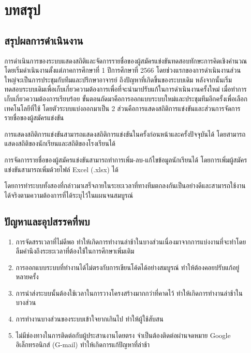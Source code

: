 \chapter{บทสรุป}
\label{chapter:conclusion}

\section{สรุปผลการดำเนินงาน}

การดำเนินการของระบบแสดงสถิติและจัดการรายชื่อของผู้สมัครแข่งขันทดสอบทักษะการคิดเชิงคำนวณ โดยเริ่มดำเนินงานตั้งแต่ภาคการศึกษาที่ 1 ปีการศึกษาที่ 2566 โดยช่วงแรกของการดำเนินงานส่วนใหญ่จะเป็นการประชุมกับทีมและปรึกษาอาจารย์ ถึงปัญหาที่เกิดขึ้นของระบบเดิม หลังจากนั้นเริ่มทดสอบระบบเดิมเพื่อเก็บเกี่ยวความต้องการเพื่อที่จะนำมาปรับแก้ในการดำเนินงานครั้งใหม่ เมื่อทำการเก็บเกี่ยวความต้องการเรียบร้อย ขั้นตอนถัดมาคือการออกแบบระบบใหม่และประชุมทีมอีกครั้งเพื่อเลือกเทคโนโลยีที่ใช้ โดยตัวระบบแบ่งออกมาเป็น 2 ส่วนคือการแสดงสถิติการแข่งขันและส่วนการจัดการรายชื่อของผู้สมัครแข่งขัน

การแสดงสถิติการแข่งขันสามารถแสดงสถิติการแข่งขันในครั้งก่อนหน้าและครั้งปัจจุบันได้ โดยสามารถแสดงสถิติของนักเรียนและสถิติของโรงเรียนได้ 

การจัดการรายชื่อของผู้สมัครแข่งขันสามารถทำการเพิ่ม-ลบ-แก้ไขข้อมูลนักเรียนได้ โดยการเพิ่มผู้สมัครแข่งขันสามารถเพิ่มด้วยไฟล์ Excel (.xlsx) ได้

โดยการทำระบบทั้งสองที่กล่าวมาเสร็จภายในระยะเวลาที่ทางทีมตกลงกันเป็นอย่างดีและสามารถใช้งานได้จริงตามความต้องการที่ได้ระบุไว้ในแผนจนสมบูรณ์

\section{ปัญหาและอุปสรรคที่พบ}

\begin{enumerate}
    \item การจัดสรรเวลาที่ไม่ดีพอ ทำให้เกิดการทำงานล่าช้าในบางส่วนเนื่องมาจากการแบ่งงานที่จะทำโดยลืมคำนึงถึงระยะเวลาที่ต้องใช้ในการศึกษาเพิ่มเติม
    \item การออกแบบระบบที่ทำงานได้ไม่ตรงกับการเขียนโค้ดได้อย่างสมบูรณ์ ทำให้ต้องคอยปรับแก้อยู่หลายครั้ง
    \item การนำส่งระบบนั้นต้องใช้เวลาในการวางโครงสร้างมากกว่าที่คาดไว้ ทำให้เกิดการทำงานล่าช้าในบางส่วน
    \item การทำงานบางส่วนของระบบเข้าใจยากเกินไป ทำให้ผู้ใช้สับสน
    \item ไม่มีช่องทางในการติดต่อกับผู้ประสานงานโดยตรง จำเป็นต้องติดต่อผ่านจดหมาย Google อิเล็กทรอนิกส์ (G-mail) ทำให้เกิดการแก้ปัญหาที่ล่าช้า
\end{enumerate}

